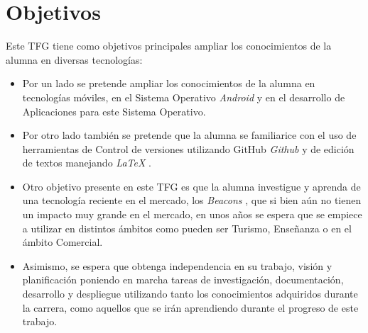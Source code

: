 %
%
%
%


\chapter{Objetivos} \label{chap:Objetivos}  

Este TFG tiene como objetivos principales ampliar los conocimientos de la alumna en diversas tecnologías:

	
\begin{itemize}
\item  	Por un lado se pretende ampliar los conocimientos de la alumna en tecnologías móviles, en el Sistema Operativo \textit{Android} \cite{URL::Android} y en el desarrollo de Aplicaciones para este Sistema Operativo.
\item Por otro lado también se pretende que la alumna se familiarice con el uso de herramientas de Control de versiones utilizando GitHub \textit{Github} \cite{URL::Github} y de edición de textos manejando \textit{LaTeX}  \cite{URL::LaTeX}.
\item Otro objetivo presente en este TFG es que la alumna investigue y aprenda de una tecnología reciente en el mercado, los \textit{Beacons} \cite{URL::Beacon} , que si bien aún no tienen un impacto muy grande en el mercado, en unos años se espera que se empiece a utilizar en distintos ámbitos como pueden ser Turismo, Enseñanza o en el ámbito Comercial.
\item  Asimismo, se espera que obtenga independencia en su trabajo, visión y planificación poniendo en marcha tareas de investigación, documentación, desarrollo y despliegue utilizando tanto los conocimientos adquiridos durante la carrera, como aquellos que se irán aprendiendo durante el progreso de este trabajo.
\end{itemize}